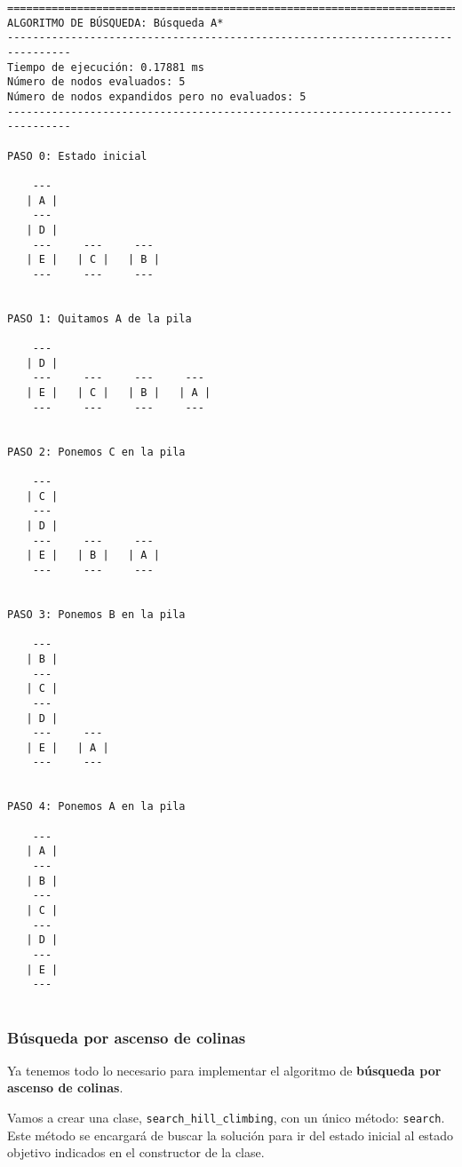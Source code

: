 \documentclass[11pt]{article}
\begin{document}
    \begin{Verbatim}[commandchars=\\\{\}]
================================================================================
ALGORITMO DE BÚSQUEDA: Búsqueda A*
--------------------------------------------------------------------------------
Tiempo de ejecución: 0.17881 ms
Número de nodos evaluados: 5
Número de nodos expandidos pero no evaluados: 5
--------------------------------------------------------------------------------

PASO 0: Estado inicial

    --- 
   | A |
    --- 
   | D |
    ---     ---     --- 
   | E |   | C |   | B |
    ---     ---     --- 


PASO 1: Quitamos A de la pila

    --- 
   | D |
    ---     ---     ---     --- 
   | E |   | C |   | B |   | A |
    ---     ---     ---     --- 


PASO 2: Ponemos C en la pila

    --- 
   | C |
    --- 
   | D |
    ---     ---     --- 
   | E |   | B |   | A |
    ---     ---     --- 


PASO 3: Ponemos B en la pila

    --- 
   | B |
    --- 
   | C |
    --- 
   | D |
    ---     --- 
   | E |   | A |
    ---     --- 


PASO 4: Ponemos A en la pila

    --- 
   | A |
    --- 
   | B |
    --- 
   | C |
    --- 
   | D |
    --- 
   | E |
    --- 


    \end{Verbatim}

    \hypertarget{buxfasqueda-por-ascenso-de-colinas}{%
\subsubsection{Búsqueda por ascenso de
colinas}\label{buxfasqueda-por-ascenso-de-colinas}}

Ya tenemos todo lo necesario para implementar el algoritmo de
\textbf{búsqueda por ascenso de colinas}.

Vamos a crear una clase, \texttt{search\_hill\_climbing}, con un único
método: \texttt{search}. Este método se encargará de buscar la solución
para ir del estado inicial al estado objetivo indicados en el
constructor de la clase.
\end{document}

